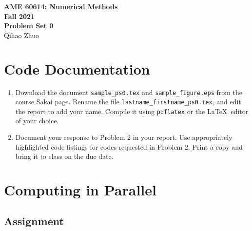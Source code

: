 \documentclass[letterpaper,10pt]{article}
\begin{document}
\fancyhf{}
\fancyfoot[C]{\thepage}

\thispagestyle{plain}
\begin{center}
  \large
  \textbf{AME 60614: Numerical Methods} \\
  \textbf{Fall 2021} \\
  \vspace{0.5em}
  \textbf{Problem Set 0} \\
  \vspace{1em}
  Qihao Zhuo
\end{center}

\vspace{1.5em}

\section{Code Documentation}

\begin{enumerate}
\item Download the document \texttt{sample\_ps0.tex} and \texttt{sample\_figure.eps} from the course Sakai page. Rename the file \texttt{lastname\_firstname\_ps0.tex}, and edit the report to add your name. Compile it using \texttt{pdflatex} or the \LaTeX\ editor of your choice.
  
\item Document your response to Problem 2 in your report. Use appropriately highlighted code listings for codes requested in Problem 2. Print a copy and bring it to class on the due date.
\end{enumerate}

\section{Computing in Parallel}
\subsection{Assignment}
\end{document}
